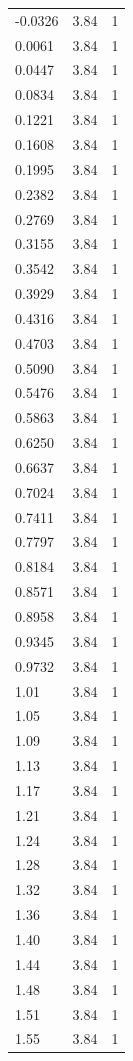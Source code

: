 \begin{longtable}{lrr}
  -0.0326 & 3.84 & 1 \\
  0.0061 & 3.84 & 1 \\
  0.0447 & 3.84 & 1 \\
  0.0834 & 3.84 & 1 \\
  0.1221 & 3.84 & 1 \\
  0.1608 & 3.84 & 1 \\
  0.1995 & 3.84 & 1 \\
  0.2382 & 3.84 & 1 \\
  0.2769 & 3.84 & 1 \\
  0.3155 & 3.84 & 1 \\
  0.3542 & 3.84 & 1 \\
  0.3929 & 3.84 & 1 \\
  0.4316 & 3.84 & 1 \\
  0.4703 & 3.84 & 1 \\
  0.5090 & 3.84 & 1 \\
  0.5476 & 3.84 & 1 \\
  0.5863 & 3.84 & 1 \\
  0.6250 & 3.84 & 1 \\
  0.6637 & 3.84 & 1 \\
  0.7024 & 3.84 & 1 \\
  0.7411 & 3.84 & 1 \\
  0.7797 & 3.84 & 1 \\
  0.8184 & 3.84 & 1 \\
  0.8571 & 3.84 & 1 \\
  0.8958 & 3.84 & 1 \\
  0.9345 & 3.84 & 1 \\
  0.9732 & 3.84 & 1 \\
  1.01 & 3.84 & 1 \\
  1.05 & 3.84 & 1 \\
  1.09 & 3.84 & 1 \\
  1.13 & 3.84 & 1 \\
  1.17 & 3.84 & 1 \\
  1.21 & 3.84 & 1 \\
  1.24 & 3.84 & 1 \\
  1.28 & 3.84 & 1 \\
  1.32 & 3.84 & 1 \\
  1.36 & 3.84 & 1 \\
  1.40 & 3.84 & 1 \\
  1.44 & 3.84 & 1 \\
  1.48 & 3.84 & 1 \\
  1.51 & 3.84 & 1 \\
  1.55 & 3.84 & 1 \\

\end{longtable}

